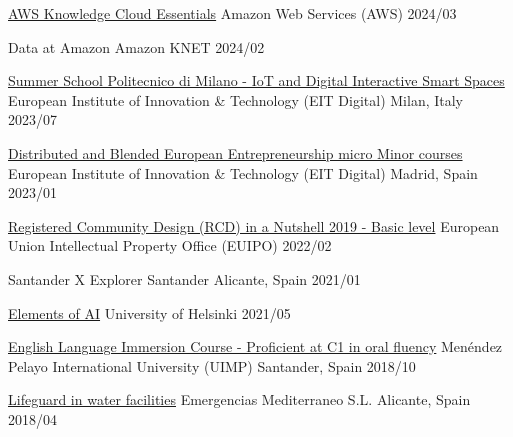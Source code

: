\begin{cvcerts}
	
	\cvcert
	{\href{https://www.credly.com/badges/7da96cd9-1320-41f2-912d-9eda06081e23/public_url}{AWS Knowledge Cloud Essentials}} %
	{Amazon Web Services (AWS)} %
	{} %
	{2024/03} %
	
	\cvcert
	{Data at Amazon} %
	{Amazon KNET} %
	{} %
	{2024/02} %
		
	\cvcertl
	{\href{https://1drv.ms/b/s!AkPthURenJLHi8VwxViOEyun28FUSQ?e=pmHmht}{Summer School Politecnico di Milano - IoT and Digital Interactive Smart Spaces}} %
	{European Institute of Innovation \& Technology (EIT Digital)} %
	{Milan, Italy} %
	{2023/07} %
	
	\cvcertl
	{\href{https://1drv.ms/b/s!AkPthURenJLHi8Vv_LR_7tQx06e70A?e=2RH5ut}{Distributed and Blended European Entrepreneurship micro Minor courses}} %
	{European Institute of Innovation \& Technology (EIT Digital)} %
	{Madrid, Spain} %
	{2023/01} %
		
	\cvcertl
	{\href{https://1drv.ms/b/s!AkPthURenJLHi8VrvSI_c4n7xcJCYQ?e=RW9j9U}{Registered Community Design (RCD) in a Nutshell 2019 - Basic level}} %
	{European Union Intellectual Property Office (EUIPO)} %
	{} %
	{2022/02} %
			
	\cvcert
	{Santander X Explorer} %
	{Santander} %
	{Alicante, Spain} %
	{2021/01} %
				
	\cvcert
	{\href{https://1drv.ms/b/s!AkPthURenJLHi8VsA1LqmEh4eUHdwg?e=kSERNG}{Elements of AI}} %
	{University of Helsinki} %
	{} %
	{2021/05} %
			
	\cvcertl
	{\href{https://1drv.ms/b/s!AkPthURenJLHi8Vx6tme1nLdTLFksw?e=fgHyIm}{English Language Immersion Course - Proficient at C1 in oral fluency}} %
	{Menéndez Pelayo International University (UIMP)} %
	{Santander, Spain} %
	{2018/10} %
				
	\cvcertl
	{\href{https://1drv.ms/b/s!AkPthURenJLHi8VyUpFrgflu8ICUhw?e=OLzRDm}{Lifeguard in water facilities}} %
	{Emergencias Mediterraneo S.L.} %
	{Alicante, Spain} %
	{2018/04} %
	
\end{cvcerts}
